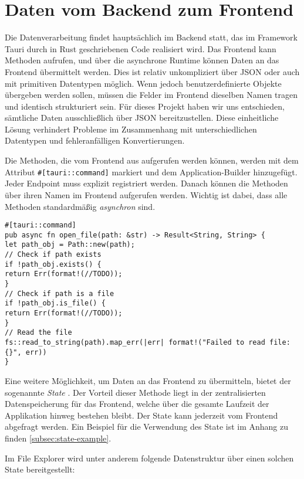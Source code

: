 \section{Daten vom Backend zum Frontend}\label{sec:Daten vom Backend zum Frontend}

Die Datenverarbeitung findet hauptsächlich im Backend statt, das im Framework Tauri \cite{tauri2025} durch in Rust geschriebenen
Code realisiert wird. Das Frontend kann Methoden aufrufen, und über die asynchrone Runtime können Daten an das Frontend
übermittelt werden. Dies ist relativ unkompliziert über JSON oder auch mit primitiven Datentypen möglich. Wenn jedoch
benutzerdefinierte Objekte übergeben werden sollen, müssen die Felder im Frontend dieselben Namen tragen und identisch
strukturiert sein. Für dieses Projekt haben wir uns entschieden, sämtliche Daten ausschließlich über JSON bereitzustellen. Diese
einheitliche Lösung verhindert Probleme im Zusammenhang mit unterschiedlichen Datentypen und fehleranfälligen Konvertierungen.

Die Methoden, die vom Frontend aus aufgerufen werden können, werden mit dem Attribut \verb|#[tauri::command]| markiert und dem
Application-Builder hinzugefügt. Jeder Endpoint muss explizit registriert werden. Danach können die Methoden über ihren Namen im
Frontend aufgerufen werden. Wichtig ist dabei, dass alle Methoden standardmäßig \textit{asynchron} sind.

\begin{verbatim}
#[tauri::command]
pub async fn open_file(path: &str) -> Result<String, String> {
let path_obj = Path::new(path);
// Check if path exists
if !path_obj.exists() {
return Err(format!(//TODO));
}
// Check if path is a file
if !path_obj.is_file() {
return Err(format!(//TODO));
}
// Read the file
fs::read_to_string(path).map_err(|err| format!("Failed to read file: {}", err))
}
\end{verbatim}

Eine weitere Möglichkeit, um Daten an das Frontend zu übermitteln, bietet der sogenannte \textit{State}
\cite{tauri_state_management}. Der Vorteil dieser Methode liegt in der zentralisierten Datenspeicherung für das Frontend, welche
über die gesamte Laufzeit der Applikation hinweg bestehen bleibt. Der State kann jederzeit vom Frontend abgefragt werden. Ein
Beispiel für die Verwendung des State ist im Anhang zu finden \ref{subsec:state-example}.

Im File Explorer wird unter anderem folgende Datenstruktur über einen solchen State bereitgestellt:

